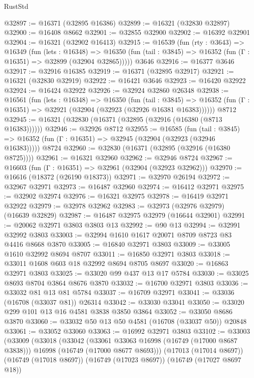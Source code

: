 \begin{lexlean}{RustStd}
\begin{coremodule}
@32897 := @16371 (@32895 @16386)
@32899 := @16321 (@32830 @32897)
@32900 := @16408 @8662
@32901 := @32855 @32900
@32902 := @16392 @32901
@32904 := @16321 (@32902 @16413)
@32915 := @16539
    (fun (rty : @3643) =>
    @16349
      (fun (lets : @16348) =>
      @16350 (fun (tail : @3845) => @16352 (fun (Γ : @16351) => @32899 (@32904 @32865)))))
    @3646
@32916 := @16377 @3646
@32917 := @32916 @16385
@32919 := @16371 (@32895 @32917)
@32921 := @16321 (@32830 @32919)
@32922 := @16421 @3646
@32923 := @16420 @32922
@32924 := @16424 @32922
@32926 := @32924 @32860 @26348
@32938 := @16561
    (fun (lets : @16348) =>
    @16350
      (fun (tail : @3845) =>
      @16352 (fun (Γ : @16351) => @32921 (@32904 (@32923 (@32926 @16381 @16383))))))
    @8712
@32945 := @16321 (@32830 (@16371 (@32895 (@32916 (@16380 (@8713 @16383))))))
@32946 := @32926 @8712
@32955 := @16585
    (fun (tail : @3845) => @16352 (fun (Γ : @16351) => @32945 (@32904 (@32923 (@32946 @16383)))))
    @8724
@32960 := @32830 (@16371 (@32895 (@32916 (@16380 @8725))))
@32961 := @16321 @32960
@32962 := @32946 @8724
@32967 := @16603 (fun (Γ : @16351) => @32961 (@32904 (@32923 @32962)))
@32970 := @16616 (@18372 (@26190 @18373))
@32971 := @32970 @26194
@32972 := @32967 @32971
@32973 := @16487 @32960
@32974 := @16412 @32971
@32975 := @32902 @32974
@32976 := @16321 @32975
@32978 := @16419 @32971 @32922
@32979 := @32978 @32962
@32983 := @32973 (@32976 @32979) (@16639 @32829)
@32987 := @16487 @32975 @32979 (@16644 @32901)
@32991 := @20062 @32971 @3803 @3803 @13
@32992 := @90 @13
@32994 := @32991 @32992 @3803
@33003 := @32994 @1610 @1617 @20071 @8709 @8723 @83 @4416 @8668 @3870
@33005 := @16840 @32971 @3803
@33009 := @33005 @1610 @32992 @8694 @8707
@33011 := @16850 @32971 @3803
@33018 := @33011 @1608 @603 @18 @32992 @8694 @8705 @8697
@33020 := @16863 @32971 @3803
@33025 := @33020 @99 @437 @13 @17 @5784
@33030 := @33025 @8693 @8704 @3864 @8676 @3870
@33032 := @16700 @32971 @3803
@33036 := @33032 @81 @13 @81 @5784
@33037 := @16709 @32971
@33041 := @33036 (@16708 (@33037 @81)) @26314
@33042 := @33030 @33041
@33050 := @33020 @299 @101 @13 @16 @4581 @3838 @3850 @3864
@33052 := @33050 @8686 @3870
@33060 := @33032 @50 @13 @50 @4581 (@16708 (@33037 @50)) @20848
@33061 := @33052 @33060
@33063 := @16992 @32971 @3803
@33102 := @33003
    (@33009
      (@33018
        (@33042
          (@33061 @33063 @16998 (@16749 (@17000 @8687 @3838)))
          @16998
          (@16749 (@17000 @8677 @8693)))
        (@17013 (@17014 @8697))
        (@16749 (@17018 @8697))
        (@16749 (@17023 @8697))
        (@16749 (@17027 @8697 @18))

\end{coremodule}
\end{lexlean}
